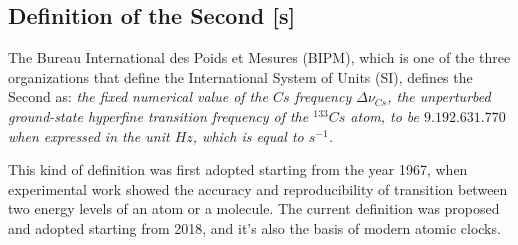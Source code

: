 \subsection{Definition of the Second [s]}
\label{subsec:second_definition}

The Bureau International des Poids et Mesures (BIPM), which is one of the three organizations that define the International System of Units (SI), defines the Second as: \textit{the fixed numerical value of the $Cs$ frequency $\Delta \nu_{Cs}$, the unperturbed ground-state hyperfine transition frequency of the $^{133}Cs$ atom, to be $9.192.631.770$ when expressed in the unit $Hz$, which is equal to $s^{-1}$.}

This kind of definition was first adopted starting from the year 1967, when experimental work showed the accuracy and reproducibility of transition between two energy levels of an atom or a molecule.
The current definition was proposed and adopted starting from 2018, and it's also the basis of modern atomic clocks.

